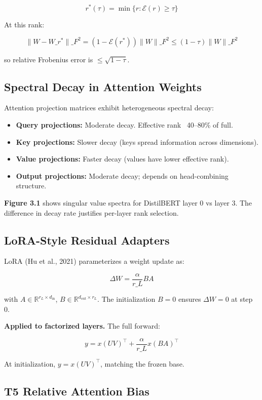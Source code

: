 \[
r^*(\tau) = \min\{r : \mathcal{E}(r) \geq \tau\}
\tag{3.5}
\]

At this rank:

\[
\|W - W\_{r^*}\|\_F^2 = (1 - \mathcal{E}(r^*)) \|W\|\_F^2 \leq (1 - \tau) \|W\|\_F^2
\tag{3.6}
\]

so relative Frobenius error is $\leq \sqrt{1 - \tau}$.

\subsection{Spectral Decay in Attention Weights}

Attention projection matrices exhibit heterogeneous spectral decay:

\begin{itemize}
\item \textbf{Query projections:} Moderate decay. Effective rank ~40--80\% of full.
\item \textbf{Key projections:} Slower decay (keys spread information across dimensions).
\item \textbf{Value projections:} Faster decay (values have lower effective rank).
\item \textbf{Output projections:} Moderate decay; depends on head-combining structure.

\end{itemize}
\textbf{Figure 3.1} shows singular value spectra for DistilBERT layer 0 vs layer 3. 
The difference in decay rate justifies per-layer rank selection.

\subsection{LoRA-Style Residual Adapters}

LoRA (Hu et al., 2021) parameterizes a weight update as:

\[
\Delta W = \frac{\alpha}{r\_L} B A
\tag{3.7}
\]

with $A \in \mathbb{R}^{r_L \times d_\text{in}}$, $B \in \mathbb{R}^{d_\text{out} \times r_L}$. 
The initialization $B = 0$ ensures $\Delta W = 0$ at step 0.

\textbf{Applied to factorized layers.} The full forward:

\[
y = x (U V)^\top + \frac{\alpha}{r\_L} x (B A)^\top
\tag{3.8}
\]

At initialization, $y = x (U V)^\top$, matching the frozen base.

\subsection{T5 Relative Attention Bias}


